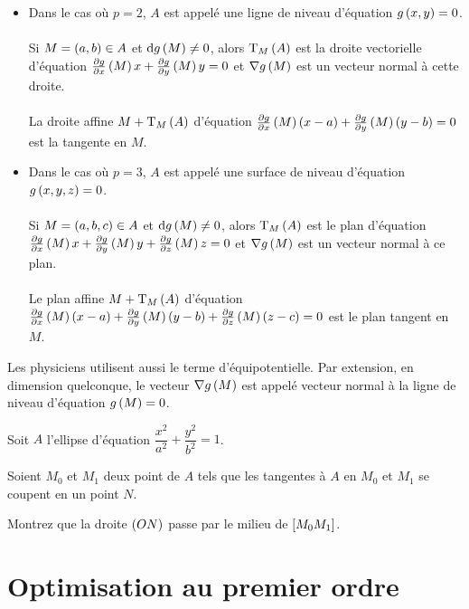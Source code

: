 \begin{rem}
\begin{itemize}
    \item Dans le cas où \(p=2\), \(A\) est appelé une ligne de niveau d'équation \(g\left(x,y\right)=0\). \\\\ Si \(M=\left(a,b\right)\in A\) et \(\odif{g}\paren{M}\not=0\), alors \(\operatorname{T}_{M}\left(A\right)\) est la droite vectorielle d'équation \(\pdv{g}{x}\left(M\right)x+\pdv{g}{y}\left(M\right)y=0\) et \(\nabla g\left(M\right)\) est un vecteur normal à cette droite. \\\\ La droite affine \(M+\operatorname{T}_{M}\left(A\right)\) d'équation \(\pdv{g}{x}\left(M\right)\left(x-a\right)+\pdv{g}{y}\left(M\right)\left(y-b\right)=0\) est la tangente en \(M\). \\
    \item Dans le cas où \(p=3\), \(A\) est appelé une surface de niveau d'équation \(g\left(x,y,z\right)=0\). \\\\ Si \(M=\left(a,b,c\right)\in A\) et \(\odif{g}\paren{M}\not=0\), alors \(\operatorname{T}_{M}\left(A\right)\) est le plan d'équation \(\pdv{g}{x}\left(M\right)x+\pdv{g}{y}\left(M\right)y+\pdv{g}{z}\left(M\right)z=0\) et \(\nabla g\left(M\right)\) est un vecteur normal à ce plan. \\\\ Le plan affine \(M+\operatorname{T}_{M}\left(A\right)\) d'équation \(\pdv{g}{x}\left(M\right)\left(x-a\right)+\pdv{g}{y}\left(M\right)\left(y-b\right)+\pdv{g}{z}\left(M\right)\left(z-c\right)=0\) est le plan tangent en \(M\).
\end{itemize}

Les physiciens utilisent aussi le terme d'équipotentielle. Par extension, en dimension quelconque, le vecteur \(\nabla g\left(M\right)\) est appelé vecteur normal à la ligne de niveau d'équation \(g\left(M\right)=0\).
\end{rem}

\begin{exo}
Soit \(A\) l'ellipse d'équation \(\dfrac{x^2}{a^2}+\dfrac{y^2}{b^2}=1\).

Soient \(M_0\) et \(M_1\) deux point de \(A\) tels que les tangentes à \(A\) en \(M_0\) et \(M_1\) se coupent en un point \(N\).

Montrez que la droite \(\left(ON\right)\) passe par le milieu de \(\left[M_0M_1\right]\).
\end{exo}

\section{Optimisation au premier ordre}

